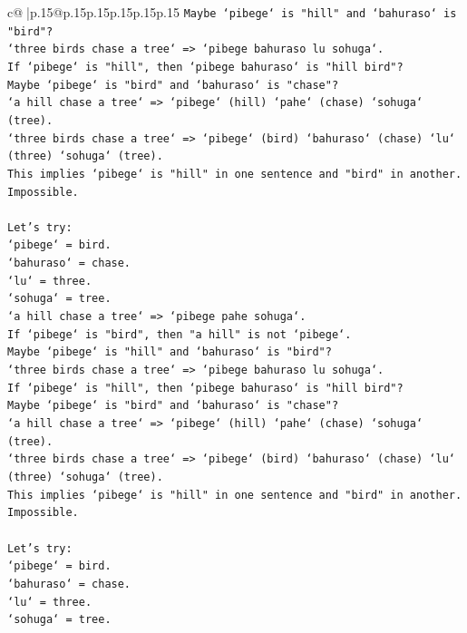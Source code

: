 \documentclass{article}
\begin{document}
{\begin{supertabular}{c@{$\;$}|p{.15\linewidth}@{}p{.15\linewidth}p{.15\linewidth}p{.15\linewidth}p{.15\linewidth}p{.15\linewidth}}
{{{\texttt{Maybe `pibege` is "hill" and `bahuraso` is "bird"?} \\
\texttt{`three birds chase a tree` => `pibege bahuraso lu sohuga`.} \\
\texttt{If `pibege` is "hill", then `pibege bahuraso` is "hill bird"?} \\
\texttt{Maybe `pibege` is "bird" and `bahuraso` is "chase"?} \\
\texttt{`a hill chase a tree` => `pibege` (hill) `pahe` (chase) `sohuga` (tree).} \\
\texttt{`three birds chase a tree` => `pibege` (bird) `bahuraso` (chase) `lu` (three) `sohuga` (tree).} \\
\texttt{This implies `pibege` is "hill" in one sentence and "bird" in another. Impossible.} \\
\\ 
\texttt{Let's try:} \\
\texttt{`pibege` = bird.} \\
\texttt{`bahuraso` = chase.} \\
\texttt{`lu` = three.} \\
\texttt{`sohuga` = tree.} \\
\texttt{`a hill chase a tree` => `pibege pahe sohuga`.} \\
\texttt{If `pibege` is "bird", then "a hill" is not `pibege`.} \\
\texttt{Maybe `pibege` is "hill" and `bahuraso` is "bird"?} \\
\texttt{`three birds chase a tree` => `pibege bahuraso lu sohuga`.} \\
\texttt{If `pibege` is "hill", then `pibege bahuraso` is "hill bird"?} \\
\texttt{Maybe `pibege` is "bird" and `bahuraso` is "chase"?} \\
\texttt{`a hill chase a tree` => `pibege` (hill) `pahe` (chase) `sohuga` (tree).} \\
\texttt{`three birds chase a tree` => `pibege` (bird) `bahuraso` (chase) `lu` (three) `sohuga` (tree).} \\
\texttt{This implies `pibege` is "hill" in one sentence and "bird" in another. Impossible.} \\
\\ 
\texttt{Let's try:} \\
\texttt{`pibege` = bird.} \\
\texttt{`bahuraso` = chase.} \\
\texttt{`lu` = three.} \\
\texttt{`sohuga` = tree.} \\
}}}
\end{supertabular}}
\end{document}
